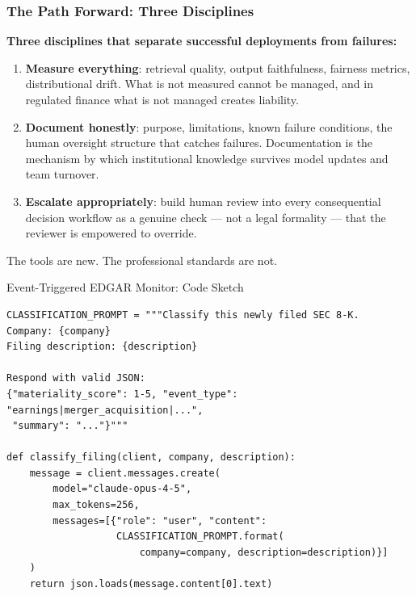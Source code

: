 \documentclass[9pt,t]{beamer}
\begin{document}
\begin{frame}
\frametitle{The Path Forward: Three Disciplines}

\textbf{Three disciplines that separate successful deployments from failures:}

\begin{enumerate}
  \item \textbf{Measure everything}: retrieval quality, output faithfulness, fairness metrics, distributional drift. What is not measured cannot be managed, and in regulated finance what is not managed creates liability.

  \item \textbf{Document honestly}: purpose, limitations, known failure conditions, the human oversight structure that catches failures. Documentation is the mechanism by which institutional knowledge survives model updates and team turnover.

  \item \textbf{Escalate appropriately}: build human review into every consequential decision workflow as a genuine check --- not a legal formality --- that the reviewer is empowered to override.
\end{enumerate}

\medskip
\begin{alertblock}{}
  The tools are new. The professional standards are not.
\end{alertblock}
\end{frame}


\begin{frame}{Event-Triggered EDGAR Monitor: Code Sketch}

\begin{lstlisting}
CLASSIFICATION_PROMPT = """Classify this newly filed SEC 8-K.
Company: {company}
Filing description: {description}

Respond with valid JSON:
{"materiality_score": 1-5, "event_type": "earnings|merger_acquisition|...",
 "summary": "..."}"""

def classify_filing(client, company, description):
    message = client.messages.create(
        model="claude-opus-4-5",
        max_tokens=256,
        messages=[{"role": "user", "content":
                   CLASSIFICATION_PROMPT.format(
                       company=company, description=description)}]
    )
    return json.loads(message.content[0].text)
\end{lstlisting}
\end{frame}
\end{document}
